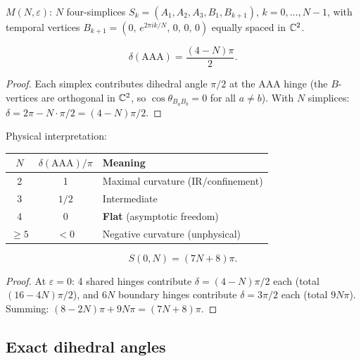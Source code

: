 \begin{remark}
\begin{definition}
$M(N,\varepsilon)$: $N$ four-simplices $S_k = (A_1, A_2, A_3, B_1, B_{k+1})$, $k = 0,\ldots,N\!-\!1$, with temporal vertices $B_{k+1} = (0,\, e^{2\pi i k/N},\, 0,\, 0,\, 0)$ equally spaced in $\mathbb{C}^2$.
\end{definition}

\begin{theorem}
\label{thm:deficit_N}
\begin{equation}
\boxed{\delta(\mathrm{AAA}) = \frac{(4-N)\pi}{2}.}
\end{equation}
\end{theorem}
\begin{proof}
Each simplex contributes dihedral angle $\pi/2$ at the AAA hinge (the $B$-vertices are orthogonal in $\mathbb{C}^2$, so $\cos\theta_{B_a B_b} = 0$ for all $a \neq b$).  With $N$ simplices: $\delta = 2\pi - N\cdot\pi/2 = (4-N)\pi/2$.
\end{proof}

Physical interpretation:
\begin{center}
\begin{tabular}{ccl}
\hline
$N$ & $\delta(\mathrm{AAA})/\pi$ & Meaning \\
\hline
2 & 1 & Maximal curvature (IR/confinement) \\
3 & $1/2$ & Intermediate \\
4 & $0$ & \textbf{Flat} (asymptotic freedom) \\
$\geq 5$ & $<0$ & Negative curvature (unphysical) \\
\hline
\end{tabular}
\end{center}

\begin{theorem}
\label{thm:action_zero}
\begin{equation}
S(0, N) = (7N + 8)\pi.
\end{equation}
\end{theorem}
\begin{proof}
At $\varepsilon = 0$: 4 shared hinges contribute $\delta = (4\!-\!N)\pi/2$ each (total $(16\!-\!4N)\pi/2$), and $6N$ boundary hinges contribute $\delta = 3\pi/2$ each (total $9N\pi$).  Summing: $(8\!-\!2N)\pi + 9N\pi = (7N\!+\!8)\pi$.
\end{proof}

\subsection{Exact dihedral angles}
\label{sec:exact_dihedrals}


\end{remark}
